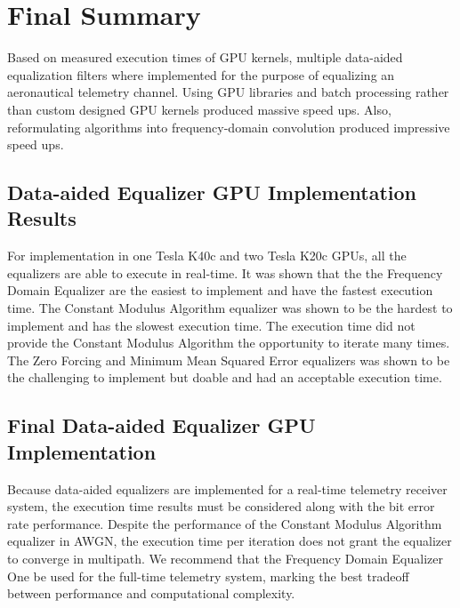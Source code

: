 \chapter{Final Summary}
\label{chap:final_summary}
Based on measured execution times of GPU kernels, multiple data-aided equalization filters where implemented for the purpose of equalizing an aeronautical telemetry channel.
Using GPU libraries and batch processing rather than custom designed GPU kernels produced massive speed ups.
Also, reformulating algorithms into frequency-domain convolution produced impressive speed ups.

\section{Data-aided Equalizer GPU Implementation Results}
For implementation in one Tesla K40c and two Tesla K20c GPUs, all the equalizers are able to execute in real-time.
It was shown that the the Frequency Domain Equalizer are the easiest to implement and have the fastest execution time.
The Constant Modulus Algorithm equalizer was shown to be the hardest to implement and has the slowest execution time.
The execution time did not provide the Constant Modulus Algorithm the opportunity to iterate many times.
The Zero Forcing and Minimum Mean Squared Error equalizers was shown to be the challenging to implement but doable and had an acceptable execution time.

\section{Final Data-aided Equalizer GPU Implementation}
Because data-aided equalizers are implemented for a real-time telemetry receiver system,
the execution time results must be considered along with the bit error rate performance.
Despite the performance of the Constant Modulus Algorithm equalizer in AWGN, the execution time per iteration does not grant the equalizer to converge in multipath.
We recommend that the Frequency Domain Equalizer One be used for the full-time telemetry system, marking the best tradeoff between performance and computational complexity.

